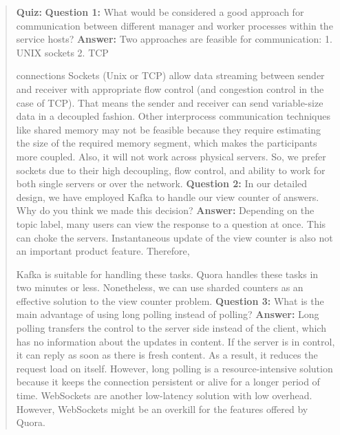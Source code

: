 \begin{quote}
\textbf{Quiz:}
\textbf{Question 1:} What would be considered a good approach for communication between different manager and worker processes within the service hosts?
\textbf{Answer:} Two approaches are feasible for communication: 1. UNIX sockets 2. TCP

connections Sockets (Unix or TCP) allow data streaming between sender and receiver with appropriate flow control (and congestion control in the case of TCP). That means the sender and receiver can send variable-size data in a decoupled fashion. Other interprocess communication techniques like shared memory may not be feasible because they require estimating the size of the required memory segment, which makes the participants more coupled. Also, it will not work across physical servers. So, we prefer sockets due to their high decoupling, flow control, and ability to work for both single servers or over the network.
\textbf{Question 2:} In our detailed design, we have employed Kafka to handle our view counter of answers. Why do you think we made this decision?
\textbf{Answer:} Depending on the topic label, many users can view the response to a question at once. This can choke the servers. Instantaneous update of the view counter is also not an important product feature. Therefore,

Kafka is suitable for handling these tasks. Quora handles these tasks in two minutes or less. Nonetheless, we can use sharded counters as an effective solution to the view counter problem.
\textbf{Question 3:} What is the main advantage of using long polling instead of polling?
\textbf{Answer:} Long polling transfers the control to the server side instead of the client, which has no information about the updates in content. If the server is in control, it can reply as soon as there is fresh content. As a result, it reduces the request load on itself. However, long polling is a resource-intensive solution because it keeps the connection persistent or alive for a longer period of time. WebSockets are another low-latency solution with low overhead. However, WebSockets might be an overkill for the features offered by Quora.
\end{quote}



